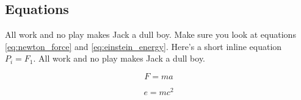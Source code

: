 
%
%

%
%

\subsection{Equations}
\label{sec:discussion_equations}

All work and no play makes Jack a dull boy.
Make sure you look at equations
\ref{eq:newton_force} and
\ref{eq:einstein_energy}.
Here's a short inline equation $P_i = F_1$.
All work and no play makes Jack a dull boy.

\begin{equation}
\label{eq:newton_force}
F = m a
\end{equation}

\begin{equation}
\label{eq:einstein_energy}
e = m c ^ 2
\end{equation}

